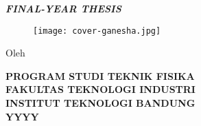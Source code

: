 \clearpage
\pagestyle{empty}

\begin{center}
	\smallskip
	
	\begin{singlespace}
		\large \MakeUppercase{\bfseries \thetitle}
	\end{singlespace}
	
	\vfill
	
	\large \MakeUppercase{\bfseries \textit{FINAL-YEAR THESIS}}
	
	\vfill
	
	\begin{figure}[h]
		\centering
		\texttt{[image: cover-ganesha.jpg]}
	\end{figure}
	
	\vfill
	
	
	
	\small{
		Oleh \\
		\theauthor
	}
	
	\vfill
	
	\begin{singlespace}
		\large
		\uppercase{
			\bfseries
			Program Studi Teknik Fisika \\
			Fakultas Teknologi Industri \\
			Institut Teknologi Bandung \\
			YYYY
		}
	\end{singlespace}
	
	
	\vfill
	
\end{center}

\clearpage
